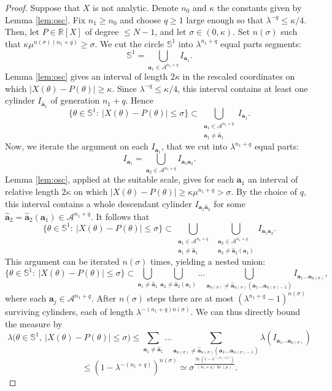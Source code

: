 \documentclass[11pt]{amsart}
\theoremstyle{plain}
\theoremstyle{definition}
\numberwithin{equation}{section}
\begin{document}
\begin{proof}
Suppose that $X$ is not analytic. Denote $n_0$ and $\kappa$ the constants given by Lemma \ref{lem:osc}. Fix $n_1 \geq n_0$ and choose $q\geq 1$ large enough so that $\lambda^{-q}\leq \kappa/4$. Then, let $P \in \mathbb{R}[X]$ of degree $\leq N-1$, and let $\sigma \in (0,\kappa)$. Set $n(\sigma)$ such that $\kappa\mu^{n(\sigma)(n_1+q)}\geq \sigma$. We cut the circle $\mathbb{S}^1$ into $\lambda^{n_1+q}$ equal parts segments:
$$
\mathbb{S}^1=\bigcup_{\mathbf{a}_1\in\mathcal{A}^{n_1+q}}I_{\mathbf{a}_1}.
$$
Lemma \ref{lem:osc} gives an interval of length $2\kappa$ in the rescaled coordinates on which $|X(\theta)-P(\theta)|\geq\kappa$. Since $\lambda^{-q}\leq\kappa/4$, this interval contains at least one cylinder $I_{\widehat{\mathbf a}_1}$ of generation $n_1+q$. Hence
$$
\{\theta\in\mathbb{S}^1:\ |X(\theta)-P(\theta)|\leq\sigma\}
\subset
\bigcup_{\substack{\mathbf a_1\in\mathcal A^{n_1+q}\\ \mathbf a_1\neq\widehat{\mathbf a}_1}}
I_{\mathbf a_1}.
$$
Now, we iterate the argument on each $I_{\mathbf a_1}$, that we cut into $\lambda^{n_1+q}$ equal parts:
$$
I_{\mathbf a_1}=\bigcup_{\mathbf a_2\in\mathcal A^{n_1+q}}I_{\mathbf a_1\mathbf a_2}.
$$
Lemma \ref{lem:osc}, applied at the suitable scale, gives for each $\mathbf a_1$ an interval of relative length $2\kappa$ on which $|X(\theta)-P(\theta)|\geq\kappa\mu^{n_1+q}>\sigma$. By the choice of $q$, this interval contains a whole descendant cylinder $I_{\mathbf a_1\widehat{\mathbf a}_2}$ for some $\widehat{\mathbf a}_2=\widehat{\mathbf a}_2(\mathbf a_1)\in\mathcal A^{n_1+q}$. It follows that
$$
\{\theta\in\mathbb{S}^1:\ |X(\theta)-P(\theta)|\leq\sigma\}
\subset
\bigcup_{\substack{\mathbf a_1\in\mathcal A^{n_1+q}\\ \mathbf a_1\neq\widehat{\mathbf a}_1}}
\ \bigcup_{\substack{\mathbf a_2\in\mathcal A^{n_1+q}\\ \mathbf a_2\neq\widehat{\mathbf a}_2(\mathbf a_1)}}
I_{\mathbf a_1\mathbf a_2}.
$$
This argument can be iterated $n(\sigma)$ times, yielding a nested union:
$$
\{\theta\in\mathbb{S}^1:\ |X(\theta)-P(\theta)|\leq\sigma\}
\subset
\bigcup_{\mathbf a_1\neq\widehat{\mathbf a}_1}
\bigcup_{\mathbf a_2\neq\widehat{\mathbf a}_2(\mathbf a_1)}
\dots
\bigcup_{\mathbf a_{n(\sigma)}\neq\widehat{\mathbf a}_{n(\sigma)}(\mathbf a_1\dots\mathbf a_{n(\sigma)-1})}
I_{\mathbf a_1\dots\mathbf a_{n(\sigma)}},
$$
where each $\mathbf a_j\in\mathcal A^{n_1+q}$. After $n(\sigma)$ steps there are at most $(\lambda^{n_1+q}-1)^{n(\sigma)}$ surviving cylinders, each of length $\lambda^{-(n_1+q)n(\sigma)}$. We can thus directly bound the measure by
$$
\lambda\Big(\theta\in\mathbb{S}^1,\ |X(\theta)-P(\theta)|\leq\sigma\Big)
\leq
\sum_{\mathbf a_1\neq\widehat{\mathbf a}_1}\dots
\sum_{\mathbf a_{n(\sigma)}\neq\widehat{\mathbf a}_{n(\sigma)}(\mathbf a_1\dots\mathbf a_{n(\sigma)-1})}
\lambda(I_{\mathbf a_1\dots\mathbf a_{n(\sigma)}})
$$
$$
\leq
(1-\lambda^{-(n_1+q)})^{n(\sigma)}
\simeq
\sigma^{\frac{\ln(1-\lambda^{-(n_1+q)})}{(n_1+q)\ln(\mu)}}.
$$
\end{proof}
\end{document}
